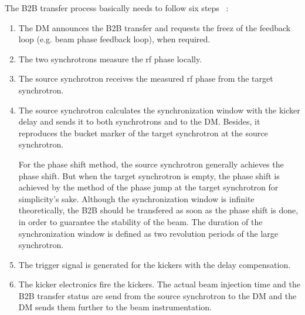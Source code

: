 The B2B transfer process basically needs to follow six steps ~\cite{bai_bunch_2015}:
\begin{enumerate}
\item The DM announces the B2B transfer and requests the freez of the feedback loop (e.g. beam phase feedback loop), when required.
\item The two synchrotrons measure the rf phase locally.
\item The source synchrotron receives the measured rf phase from the target synchrotron.
\item The source synchrotron calculates the synchronization window with the kicker delay and sends it to both synchrotrons and to the DM. Besides, it reproduces the bucket marker of the target synchrotron at the source synchrotron.

For the phase shift method, the source synchrotron generally achieves the phase shift. But when the target synchrotron is empty, the phase shift is achieved by the method of the phase jump at the target synchrotron for simplicity's sake. Although the synchronization window is infinite theoretically, the B2B should be transfered as soon as the phase shift is done, in order to guarantee the stability of the beam. The duration of the synchronization window is defined as two revolution periods of the large synchrotron. 
\item The trigger signal is generated for the kickers with the delay compensation.
\item The kicker electronics fire the kickers. The actual beam injection time and the B2B transfer status are send from the source synchrotron to the DM and the DM sends them further to the beam instrumentation.

\end{enumerate}




